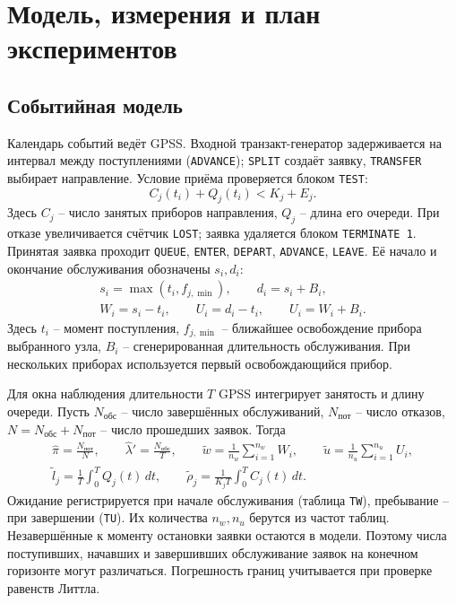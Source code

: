 \documentclass[12pt,a4paper]{article}
\begin{document}
\section{Модель, измерения и план экспериментов}
\subsection{Событийная модель}
Календарь событий ведёт GPSS. Входной транзакт-генератор задерживается на интервал между поступлениями (\texttt{ADVANCE}); \texttt{SPLIT} создаёт заявку, \texttt{TRANSFER} выбирает направление. Условие приёма проверяется блоком \texttt{TEST}:
\begin{equation}
C_j(t_i)+Q_j(t_i)<K_j+E_j.
\end{equation}
Здесь \(C_j\) -- число занятых приборов направления, \(Q_j\) -- длина его очереди. При отказе увеличивается счётчик \texttt{LOST}; заявка удаляется блоком \texttt{TERMINATE 1}. Принятая заявка проходит \texttt{QUEUE}, \texttt{ENTER}, \texttt{DEPART}, \texttt{ADVANCE}, \texttt{LEAVE}. Её начало и окончание обслуживания обозначены \(s_i,d_i\):
\begin{gather}
s_i=\max(t_i,f_{j,\min}),\qquad d_i=s_i+B_i,\\
W_i=s_i-t_i,\qquad U_i=d_i-t_i,\qquad U_i=W_i+B_i.
\end{gather}
Здесь \(t_i\) -- момент поступления, \(f_{j,\min}\) -- ближайшее освобождение прибора выбранного узла, \(B_i\) -- сгенерированная длительность обслуживания. При нескольких приборах используется первый освобождающийся прибор.

Для окна наблюдения длительности \(T\) GPSS интегрирует занятость и длину очереди. Пусть \(N_{\text{обс}}\) -- число завершённых обслуживаний, \(N_{\text{пот}}\) -- число отказов, \(N=N_{\text{обс}}+N_{\text{пот}}\) -- число прошедших заявок. Тогда
\begin{gather}
\widehat\pi=\frac{N_{\text{пот}}}{N},\qquad
\widehat\lambda'=\frac{N_{\text{обс}}}{T},\qquad
\widetilde w=\frac1{n_w}\sum_{i=1}^{n_w} W_i,\qquad
\widetilde u=\frac1{n_u}\sum_{i=1}^{n_u} U_i,\\
\widetilde l_j=\frac1T\int_0^TQ_j(t)\,dt,\qquad
\widetilde\rho_j=\frac1{K_jT}\int_0^TC_j(t)\,dt.
\end{gather}
Ожидание регистрируется при начале обслуживания (таблица \texttt{TW}), пребывание -- при завершении (\texttt{TU}). Их количества \(n_w,n_u\) берутся из частот таблиц. Незавершённые к моменту остановки заявки остаются в модели. Поэтому числа поступивших, начавших и завершивших обслуживание заявок на конечном горизонте могут различаться. Погрешность границ учитывается при проверке равенств Литтла.
\end{document}
